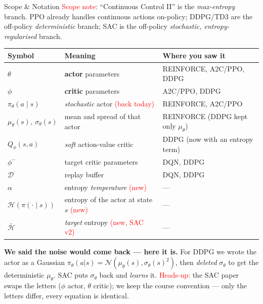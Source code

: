 \begin{frame}{Scope \& Notation}
\vspace{-0.3em}
{\footnotesize \textcolor{red}{Scope note:} ``Continuous Control II'' is the \emph{max-entropy} branch. PPO already handles continuous actions on-policy; DDPG/TD3 are the off-policy \emph{deterministic} branch; SAC is the off-policy \emph{stochastic, entropy-regularised} branch.}
\vspace{-0.2em}
\begin{center}
\small
\renewcommand{\arraystretch}{1.0}
\begin{tabular}{@{}lll@{}}
\hline
\textbf{Symbol} & \textbf{Meaning} & \textbf{Where you saw it} \\
\hline
$\theta$                        & \textbf{actor} parameters                         & REINFORCE, A2C/PPO, DDPG \\
$\phi$                          & \textbf{critic} parameters                        & A2C/PPO, DDPG \\
$\pi_\theta(a\mid s)$           & \emph{stochastic} actor \;\textcolor{red}{(back today)} & REINFORCE, A2C/PPO \\
$\mu_\theta(s),\ \sigma_\theta(s)$ & mean and spread of that actor                  & REINFORCE (DDPG kept only $\mu_\theta$) \\
$Q_\phi(s,a)$                   & \emph{soft} action-value critic                   & DDPG (now with an entropy term) \\
$\phi^{-}$                      & target critic parameters                          & DQN, DDPG \\
$\mathcal{D}$                   & replay buffer                                     & DQN, DDPG \\
$\alpha$                        & entropy \emph{temperature} \;\textcolor{red}{(new)} & --- \\
$\mathcal{H}(\pi(\cdot\mid s))$ & entropy of the actor at state $s$ \;\textcolor{red}{(new)} & --- \\
$\bar{\mathcal{H}}$             & \emph{target} entropy \;\textcolor{red}{(new, SAC v2)} & --- \\
\hline
\end{tabular}
\end{center}
\vspace{0.3em}
{\scriptsize \textbf{We said the noise would come back --- here it is.} For DDPG we wrote the actor as a Gaussian $\pi_\theta(a|s)=\mathcal{N}(\mu_\theta(s),\sigma_\theta(s)^2)$, then \emph{deleted} $\sigma_\theta$ to get the deterministic $\mu_\theta$. SAC puts $\sigma_\theta$ back and \emph{learns} it. \;\textcolor{red}{Heads-up:} the SAC paper swaps the letters ($\phi$ actor, $\theta$ critic); we keep the course convention --- only the letters differ, every equation is identical.}
\end{frame}
